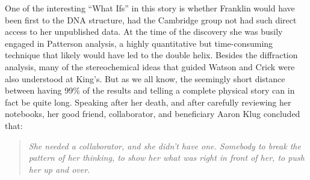 \documentclass[12pt]{article}
\begin{document}
One of the interesting ``What Ifs'' in this story is whether Franklin would have
been first to the DNA structure, had the Cambridge group not had such direct
access to her unpublished data. At the time of the discovery she was busily
engaged in Patterson analysis, a highly quantitative but time-consuming
technique that likely would have led to the double helix. Besides the
diffraction analysis, many of the stereochemical ideas that guided Watson and
Crick were also understood at King's. But as we all know, the seemingly short
distance between having 99\% of the results and telling a complete physical
story can in fact be quite long. Speaking after her death, and after carefully
reviewing her notebooks, her good friend, collaborator, and beneficiary Aaron
Klug concluded that:

\begin{quotation}
  {\it She needed a collaborator, and she didn't have one. Somebody to break
  the pattern of her thinking, to show her what was right in front of her, to
  push her up and over.}
\end{quotation}
\end{document}
